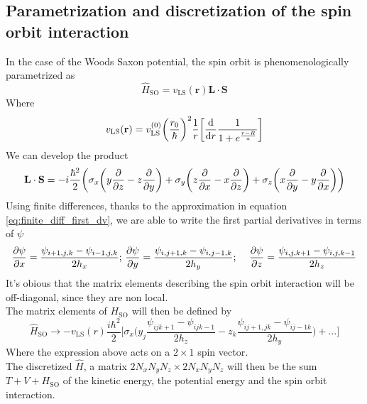 \subsection{Parametrization and discretization of the spin orbit interaction}
In the case of the Woods Saxon potential, the spin orbit is phenomenologically parametrized as
\begin{equation}
    \hat {H}_\text{SO} = v_{\text{LS}}(\mathbf{r})\mathbf{L}\cdot \mathbf{S}
\end{equation}
Where 
\begin{equation}
    v_{\text{LS}}(\mathbf{r}) = v_{\text{LS}}^{(0)}\bigg(\frac{r_0}{\hbar}\bigg)^2\frac 1 r \bigg[\dv{r}\frac 1 {1+ e^{\frac{r-R}{a}}}\bigg]
\end{equation}
We can develop the product 
\begin{equation}
    \mathbf{L}\cdot \mathbf{S} = -i\frac {\hbar^2} 2 \bigg(\sigma_x \bigg(y\pdv{z} - z\pdv{y}\bigg) + \sigma_y \bigg(z\pdv{x} - x\pdv{z}\bigg) + \sigma_z \bigg(x\pdv{y} - y\pdv{x}\bigg)\bigg)
\end{equation}
Using finite differences, thanks to the approximation in equation \ref{eq:finite_diff_first_dv}, we are able to write the first partial derivatives in terms of $\psi$
\begin{align*}
    \pdv{\psi}{x} = \frac {\psi_{i+1, j, k} - \psi_{i-1, j, k}}{2h_x}
    ;&\ \pdv{\psi}{y} = \frac {\psi_{i, j+1, k} - \psi_{i, j-1, k}}{2h_y}
    ;&\ \pdv{\psi}{z} = \frac {\psi_{i, j, k+1} - \psi_{i, j, k-1}}{2h_z}
\end{align*}
It's obious that the matrix elements describing the spin orbit interaction will be off-diagonal, since they are non local.
\\The matrix elements of $H_\text{SO}$ will then be defined by
\begin{equation}
    \hat{H}_\text{SO} \rightarrow -v_\text{LS}(r)\frac{i\hbar^2}{2} \bigg[\sigma_x \bigg(y_j \frac{\psi_{ijk+1} - \psi_{ijk-1}}{2h_z} - z_k \frac{\psi_{ij+1, jk} - \psi_{ij-1k}}{2h_y}\bigg) + \ldots\bigg]
\end{equation}
Where the expression above acts on a $2\times 1$ spin vector.
\\The discretized $\hat H$, a matrix $2N_x N_y N_z\times 2N_x N_y N_z$ will then be the sum $T + V + H_{\text{SO}}$ of the kinetic energy, the potential energy and the spin orbit interaction. 

